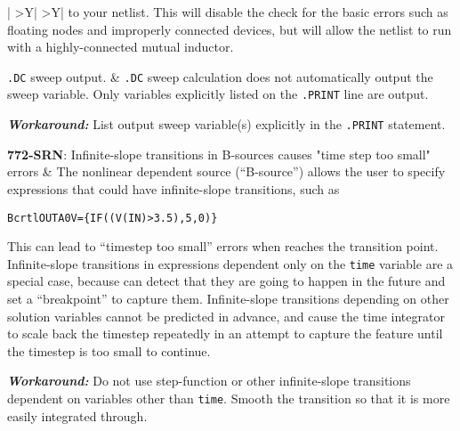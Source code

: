 \begin{longtable}[h,t,b,p] {|
>{\setlength{\hsize}{0.40\hsize}}Y|
>{\setlength{\hsize}{0.60\hsize}}Y|}
to your netlist.  This will disable the check for the basic errors such
as floating nodes and improperly connected devices, but will allow the
netlist to run with a highly-connected mutual inductor. \\ \hline

\texttt{.DC} sweep output. & \texttt{.DC} sweep calculation does not
automatically output the sweep variable.  Only variables explicitly listed on the \texttt{.PRINT} line are output.

{\bf\it Workaround:} List output sweep variable(s) explicitly in the \texttt{.PRINT} statement.  \\ \hline

{\bf 772-SRN}: Infinite-slope transitions in B-sources causes "time step
too small" errors & The nonlinear dependent source (``B-source'') allows
the user to specify expressions that could have infinite-slope
transitions, such as

\begin{alltt}
Bcrtl OUTA 0 V=\{ IF( (V(IN) > 3.5), 5, 0 ) \} 
\end{alltt}

This can lead to ``timestep too small'' errors when \Xyce{} reaches
the transition point.  Infinite-slope transitions in expressions
dependent only on the \texttt{time} variable are a special case,
because \Xyce{} can detect that they are going to happen in the future
and set a ``breakpoint'' to capture them.  Infinite-slope transitions
depending on other solution variables cannot be predicted in advance,
and cause the time integrator to scale back the timestep repeatedly in
an attempt to capture the feature until the timestep is too small to
continue.

{\bf\it Workaround:} Do not use step-function or other infinite-slope
transitions dependent on variables other than \texttt{time}.  Smooth
the transition so that it is more easily integrated through. \\ \hline


\end{longtable}

